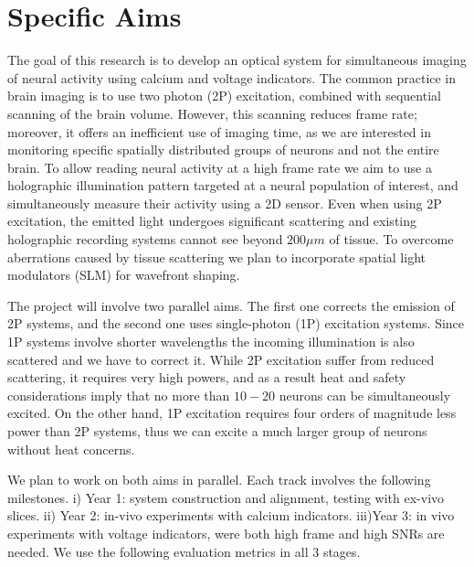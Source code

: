 \section*{Specific Aims}

The goal of this research is to develop an optical system for simultaneous imaging of neural activity using calcium and voltage indicators. 
The common practice in brain imaging is to use two photon (2P) excitation,  combined with sequential scanning of the brain volume. However, this scanning reduces frame rate; moreover, it offers an inefficient  use of imaging time, as we are  interested in monitoring specific spatially distributed groups of neurons and not the entire brain.
To allow reading neural activity at a high frame rate we aim to
use a holographic illumination pattern targeted at a neural population of interest, and simultaneously measure their activity using a 2D sensor. 
 Even when using 2P excitation, the emitted light  undergoes significant scattering and existing  holographic recording systems cannot see beyond $200\mu m$ of tissue.
 To overcome aberrations caused by tissue scattering we plan to incorporate spatial light modulators (SLM) for wavefront shaping. 

The project will involve two parallel aims. The first one corrects the emission of 2P systems, and the second one uses single-photon (1P) excitation systems. Since 1P systems involve shorter wavelengths the incoming illumination is also scattered  and we  have to correct it. 
While 2P excitation suffer  from reduced scattering, it requires very high powers, and as a result heat and safety considerations imply that no more than $10-20$ neurons can be simultaneously excited.  
On the other hand, 1P excitation requires four orders of magnitude less power than 2P systems, thus we can excite a much larger group of neurons without heat concerns.
	
We plan to work on both aims in parallel. Each track involves the following milestones. i) Year 1: system construction and alignment,  testing with ex-vivo   slices. ii) Year 2: in-vivo experiments with calcium indicators. iii)Year 3: in vivo experiments with voltage indicators, were both high frame and high SNRs are needed. We use the following evaluation metrics in all 3 stages.


